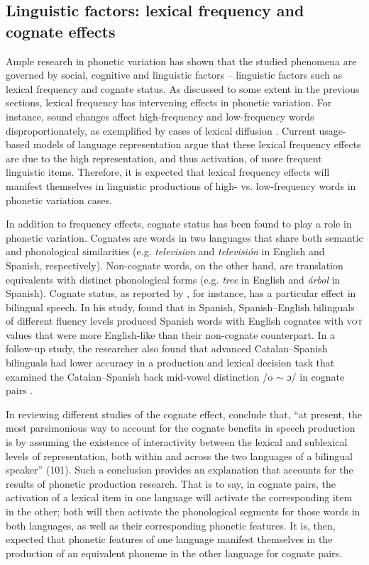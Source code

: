 \documentclass[output=paper,colorlinks,citecolor=brown,
]{langscibook}
\begin{document}
\subsection{Linguistic factors: lexical frequency and cognate effects}

Ample research in phonetic variation has shown that the studied phenomena are governed by social, cognitive and linguistic factors -- linguistic factors such as lexical frequency and cognate status. As discussed to some extent in the previous sections, lexical frequency has intervening effects in phonetic variation. For instance, sound changes affect high-frequency and low-frequency words disproportionately, as exemplified by cases of lexical diffusion \citep{schuchardt1885lautgesetze,phillips1984word,phillips1999mental,bybee2000phonology}. Current usage-based models of language representation argue that these lexical frequency effects are due to the high representation, and thus activation, of more frequent linguistic items. Therefore, it is expected that lexical frequency effects will manifest themselves in linguistic productions of high- vs. low-frequency words in phonetic variation cases.

In addition to frequency effects, cognate status has been found to play a role in phonetic variation. Cognates are words in two languages that share both semantic and phonological similarities (e.g. \emph{television} and \emph{televisi{\'o}n} in English and Spanish, respectively). Non-cognate words, on the other hand, are translation equivalents with distinct phonological forms (e.g. \emph{tree} in English and \emph{{\'a}rbol} in Spanish). Cognate status, as reported by \citet{amengual2012interlingual}, for instance, has a particular effect in bilingual speech. In his study, \citeauthor{amengual2012interlingual} found that in Spanish, Spanish--English bilinguals of different fluency levels produced Spanish words with English cognates with \textsc{vot} values that were more English-like than their non-cognate counterpart. In a follow-up study, the researcher also found that advanced Catalan--Spanish bilinguals had lower accuracy in a production and lexical decision task that examined the Catalan--Spanish back mid-vowel distinction /o $\sim$ ɔ/ in cognate pairs \citep{amengual2016cross}.

In reviewing different studies of the cognate effect, \citet{costa2005facilitatory} conclude that, ``at present, the most parsimonious way to account for the cognate benefits in speech production is by assuming the existence of interactivity between the lexical and sublexical levels of representation, both within and across the two languages of a bilingual speaker'' (101). Such a conclusion provides an explanation that accounts for the results of phonetic production research. That is to say, in cognate pairs, the activation of a lexical item in one language will activate the corresponding item in the other; both will then activate the phonological segments for those words in both languages, as well as their corresponding phonetic features. It is, then, expected that phonetic features of one language manifest themselves in the production of an equivalent phoneme in the other language for cognate pairs.
\end{document}
